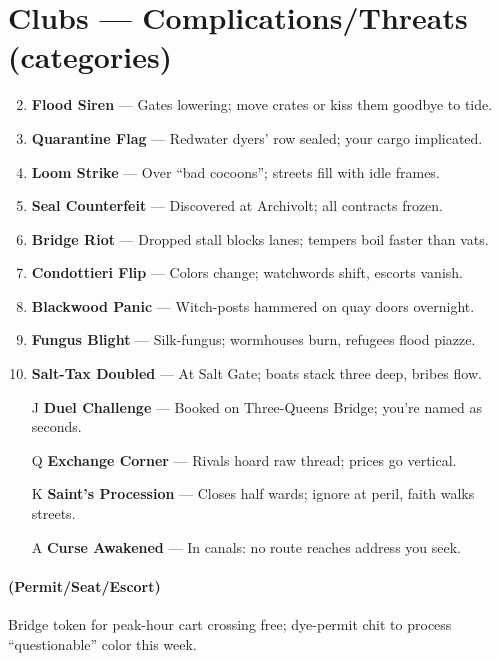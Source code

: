 \section*{Clubs --- Complications/Threats (categories)}
\label{sec:silkstrand-complications}
\begin{enumerate}
\setcounter{enumi}{1}
\item \textbf{Flood Siren} --- Gates lowering; move crates or kiss them goodbye to tide.
\item \textbf{Quarantine Flag} --- Redwater dyers' row sealed; your cargo implicated.
\item \textbf{Loom Strike} --- Over ``bad cocoons''; streets fill with idle frames.
\item \textbf{Seal Counterfeit} --- Discovered at Archivolt; all contracts frozen.
\item \textbf{Bridge Riot} --- Dropped stall blocks lanes; tempers boil faster than vats.
\item \textbf{Condottieri Flip} --- Colors change; watchwords shift, escorts vanish.
\item \textbf{Blackwood Panic} --- Witch-posts hammered on quay doors overnight.
\item \textbf{Fungus Blight} --- Silk-fungus; wormhouses burn, refugees flood piazze.
\item \textbf{Salt-Tax Doubled} --- At Salt Gate; boats stack three deep, bribes flow.
\item[J] \textbf{Duel Challenge} --- Booked on Three-Queens Bridge; you're named as seconds.
\item[Q] \textbf{Exchange Corner} --- Rivals hoard raw thread; prices go vertical.
\item[K] \textbf{Saint's Procession} --- Closes half wards; ignore at peril, faith walks streets.
\item[A] \textbf{Curse Awakened} --- In canals: no route reaches address you seek.
\end{enumerate}

\paragraph*{(Permit/Seat/Escort)} Bridge token for peak-hour cart crossing free; dye-permit chit to process ``questionable'' color this week.

